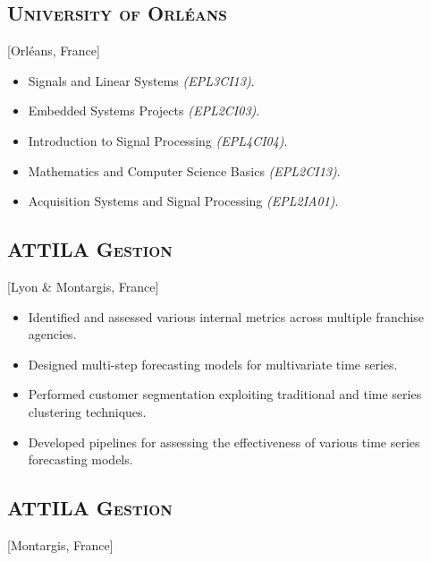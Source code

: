\documentclass{mycv}
\begin{document}
\subsection{\large \scshape University of Orl\'eans}[Orl\'eans, France]

\begin{positions}
\end{positions}

\begin{itemize}
  \itemsep 0em
  \item Signals and Linear Systems \textit{(EPL3CI13)}.
  \item Embedded Systems Projects \textit{(EPL2CI03)}.
  \item Introduction to Signal Processing \textit{(EPL4CI04)}.
  \item Mathematics and Computer Science Basics \textit{(EPL2CI13)}.
  \item Acquisition Systems and Signal Processing \textit{(EPL2IA01)}.
\end{itemize}

\subsection{\large \scshape ATTILA Gestion}[Lyon \& Montargis, France]

\begin{positions}
\end{positions}

\begin{itemize}
  \itemsep 0em
  \item Identified and assessed various internal metrics across multiple franchise agencies.
  \item Designed multi-step forecasting models for multivariate time series.
  \item Performed customer segmentation exploiting traditional and time series clustering techniques.
  \item Developed pipelines for assessing the effectiveness of various time series forecasting models.
\end{itemize}

\subsection{\large \scshape ATTILA Gestion}[Montargis, France]
\end{document}

